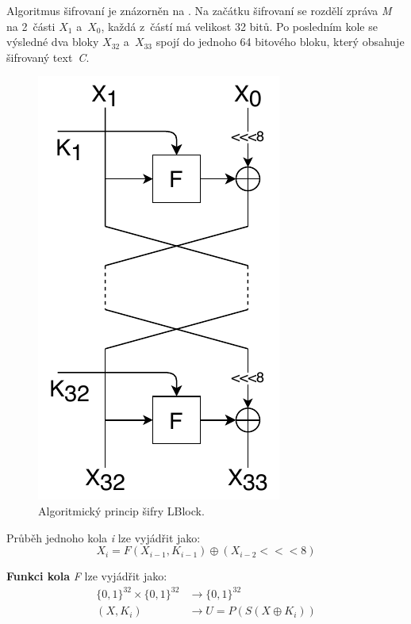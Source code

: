 Algoritmus šifrovaní je znázorněn na . Na začátku šifrovaní se rozdělí zpráva \textit{M} na 2~části $X_1$ a~$X_0$, každá z~částí má velikost 32 bitů. Po posledním kole se výsledné dva bloky $X_{32}$ a~$X_{33}$ spojí do jednoho 64 bitového bloku, který obsahuje šifrovaný text~\textit{C}.\cite{LBlock}
\begin{figure}[!h]
  \begin{center}
    \includegraphics[scale=1]{obrazky/LBlock.pdf}
  \end{center}
  \caption[Algoritmický princip šifry LBlock]{Algoritmický princip šifry LBlock.\cite{LBlock}}
  \label{img:Lblock}
\end{figure}

\noindent Průběh jednoho kola \textit{i} lze vyjádřit jako:
\[X_i = F(X_{i-1}, K_{i-1})\oplus (X_{i-2}<<<8)\]

\noindent \textbf{Funkci kola} \textit{F} lze vyjádřit jako:
\begin{align*}
    \{0,1\}^{32} \times \{0,1\}^{32} & \longrightarrow \{0,1\}^{32}\\
    (X, K_i) & \longrightarrow U = P(S(X \oplus K_i))
\end{align*}

